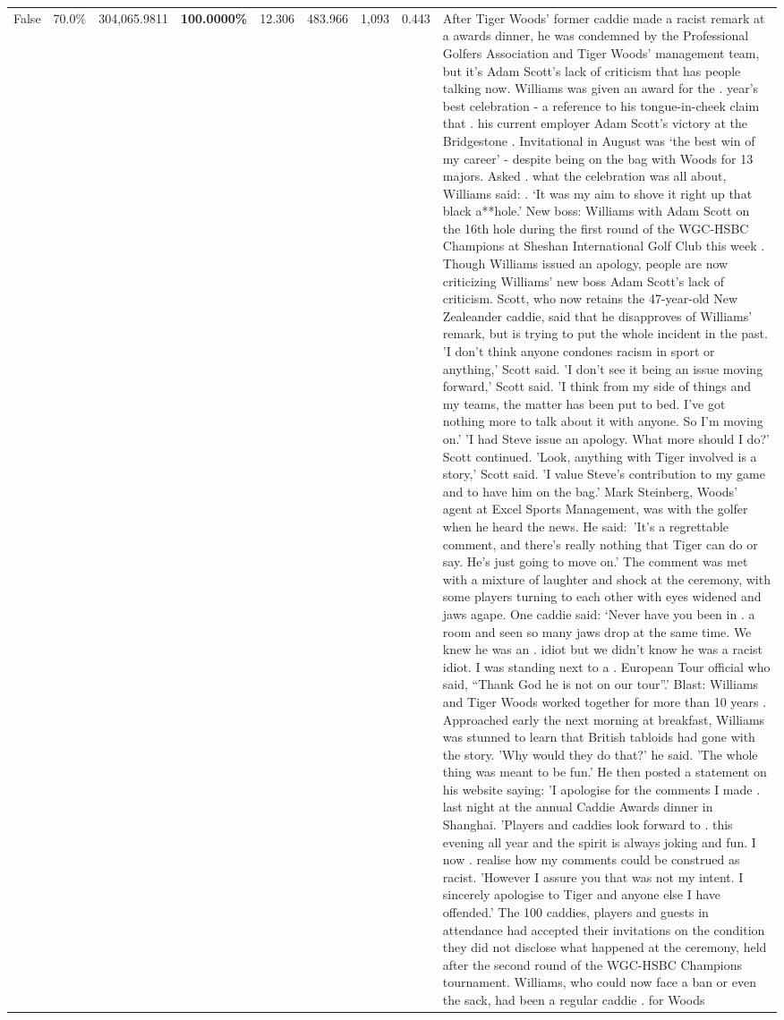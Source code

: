 \begin{table}[H]
\begin{tabular}{lllrlllll}
False & 70.0\% & \color{red} 304,065.9811 & \bfseries \color{red} 100.0000\% & 12.306 & 483.966 & 1,093 & 0.443 & After Tiger Woods' former caddie made a racist remark at a awards dinner, he was condemned by the Professional Golfers Association and Tiger Woods' management team, but it's Adam Scott's lack of criticism that has people talking now. Williams was given an award for the . year’s best celebration - a reference to his tongue-in-cheek claim that . his current employer Adam Scott’s victory at the Bridgestone . Invitational in August was ‘the best win of my career’ - despite being on the bag with Woods for 13 majors. Asked . what the celebration was all about, Williams said: . ‘It was my aim to shove it right up that black a**hole.’ New boss: Williams with Adam Scott  on the 16th hole during the first round of the WGC-HSBC Champions at Sheshan International Golf Club this week . Though Williams issued an apology, people are now criticizing Williams' new boss Adam Scott's lack of criticism. Scott, who now retains the 47-year-old New Zealeander caddie, said that he disapproves of Williams' remark, but is trying to put the whole incident in the past. 'I don't think anyone condones racism in sport or anything,' Scott said. 'I don't see it being an issue moving forward,' Scott said. 'I think from my side of things and my teams, the matter has been put to bed. I've got nothing more to talk about it with anyone. So I'm moving on.' 'I had Steve issue an apology. What more should I do?' Scott continued. 'Look, anything with Tiger involved is a story,' Scott said. 'I value Steve's contribution to my game and to have him on the bag.' Mark Steinberg, Woods' agent at Excel Sports Management, was with the golfer when he heard the news. He said: 'It's a regrettable comment, and there's really nothing that Tiger can do or say. He's just going to move on.' The comment was met with a mixture of laughter and shock at the ceremony, with some players turning to each other with eyes widened and jaws agape. One caddie said: ‘Never have you been in . a room and seen so many jaws drop at the same time. We knew he was an . idiot but we didn’t know he was a racist idiot. I was standing next to a . European Tour official who said, “Thank God he is not on our tour”.’ Blast: Williams and Tiger Woods worked together for more than 10 years . Approached early the next morning at breakfast, Williams was stunned to learn that British tabloids had gone with the story. 'Why would they do that?' he said. 'The whole thing was meant to be fun.' He then posted a statement on his website saying: 'I apologise for the comments I made . last night at the annual Caddie Awards dinner in Shanghai. 'Players and caddies look forward to . this evening all year and the spirit is always joking and fun. I now . realise how my comments could be construed as racist. 'However I assure you that was not my intent. I sincerely apologise to Tiger and anyone else I have offended.' The 100 caddies, players and guests in attendance had accepted their invitations on the condition they did not disclose what happened at the ceremony, held after the second round of the WGC-HSBC Champions tournament. Williams, who could now face a ban or even the sack, had been a regular caddie . for Woods 
\end{tabular}
\end{table}
